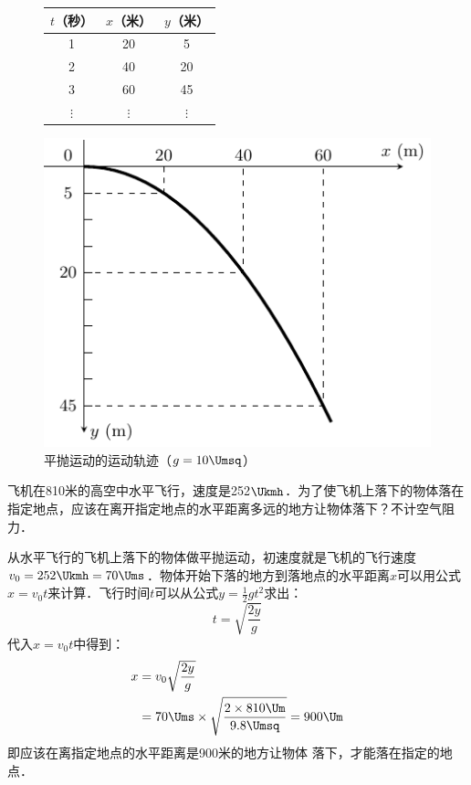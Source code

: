 \begin{figure}[htbp]
    \centering
    \begin{minipage}{0.35\linewidth}
    	\centering
    	\begin{tabular}{ccc}
    		\toprule
    		$t$（秒）   &  $x$（米）   &  $y$（米）\\
    		\midrule
    		1 & 20 & 5\\
    		2 & 40 & 20\\
    		3 & 60 & 45\\
    		$\vdots$ & $\vdots$ & $\vdots$\\
    		\bottomrule
    	\end{tabular}
    \end{minipage}
    \hfil
    \begin{minipage}{0.5\linewidth}
    	\centering
    	\includegraphics{fig/A/4-11.pdf}
    \end{minipage}
    \caption{平抛运动的运动轨迹（$g=10 \Umsq $）}\label{fig_A_4-11}
\end{figure}

\begin{example}
飞机在810米的高空中水平飞行，速度是252$\Ukmh$．为了使飞机上落下的物体落在指定地点，应该在离开指定地点的水平距离多远的地方让物体落下？不计空气阻力．
\end{example}

\begin{solution}
从水平飞行的飞机上落下的物体做平抛运动，初速度就是飞机的飞行速度$v_0=252\Ukmh=70\Ums$．物体开始下落的地方到落地点的水平距离$x$可以用公式$x=v_0t$来计算．飞行时间$t$可以从公式$y=\frac{1}{2}gt^2$求出：
\[t=\sqrt{\frac{2y}{g}} \]
代入$x=v_0 t$中得到：
\[\begin{split}
x&=v_0\sqrt{\frac{2y}{g}}\\
&=70\Ums \times \sqrt{\frac{2\times 810 \Um}{9.8\Umsq}}=900\Um
\end{split} \]
即应该在离指定地点的水平距离是900米的地方让物体
落下，才能落在指定的地点．
\end{solution}


